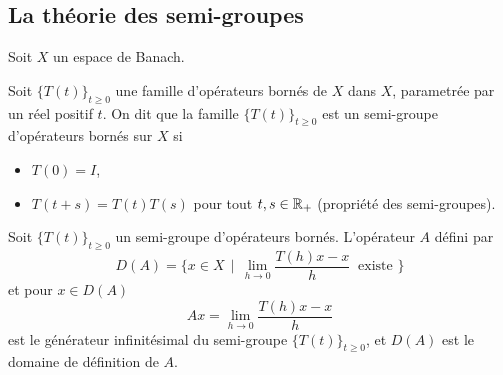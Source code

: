 
\subsection{La théorie des semi-groupes}
\begin{frame}
    Soit $X$ un espace de Banach.
    \begin{definition}
        Soit $\big\{T(t)\big\}_{t \geq 0}$ une famille d'opérateurs bornés de $X$ dans $X$, parametrée par un réel positif $t$. On dit que la famille $\big\{T(t)\big\}_{t \geq 0}$ est un \textcolor{astral}{semi-groupe d'opérateurs bornés sur $X$} si 
        \begin{itemize}
            \item[$(i)$] $T(0)=I$,
            \item[$(ii)$] $T(t+s)=T(t)T(s)$ pour tout $t,s \in \mathbb{R}_+$ (propriété des semi-groupes). 
        \end{itemize}
    \end{definition}
    \pause
    \begin{definition}
        Soit $\big\{T(t)\big\}_{t \geq 0}$ un semi-groupe d'opérateurs bornés. L'opérateur $A$ défini par 
        \begin{equation*}
            D(A) = \Big\{ x \in X \ \ | \ \ \lim_{h \to 0} \frac{T(h)x-x}{h} \ \text{ existe } \Big\}
        \end{equation*}
        et pour $x \in D(A)$
        \begin{equation*}
            Ax = \lim_{h \to 0} \frac{T(h)x-x}{h}
        \end{equation*}
        est le \textcolor{astral}{générateur infinitésimal du semi-groupe $\big\{T(t)\big\}_{t \geq 0}$}, et $D(A)$ est le domaine de définition de $A$.
    \end{definition}
\end{frame}

